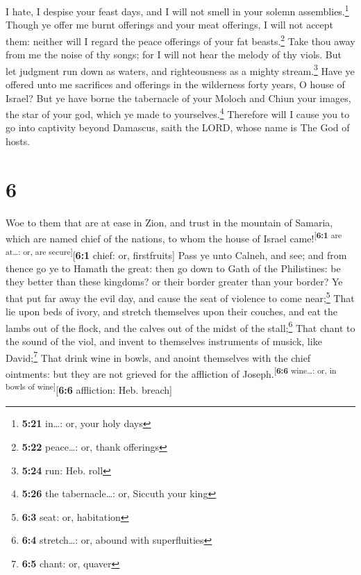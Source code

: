  I hate, I despise your feast days, and I will not smell
in your solemn assemblies.\footnote{\textbf{5:21} in\ldots: or, your
  holy days}  Though ye offer me burnt offerings and your
meat offerings, I will not accept them: neither will I regard the peace
offerings of your fat beasts.\footnote{\textbf{5:22} peace\ldots: or,
  thank offerings}  Take thou away from me the noise of
thy songs; for I will not hear the melody of thy viols. 
But let judgment run down as waters, and righteousness as a mighty
stream.\footnote{\textbf{5:24} run: Heb. roll}  Have ye
offered unto me sacrifices and offerings in the wilderness forty years,
O house of Israel?  But ye have borne the tabernacle of
your Moloch and Chiun your images, the star of your god, which ye made
to yourselves.\footnote{\textbf{5:26} the tabernacle\ldots: or, Siccuth
  your king}  Therefore will I cause you to go into
captivity beyond Damascus, saith the LORD, whose name is The God of
hosts.

\hypertarget{section-5}{%
\section{6}\label{section-5}}

 Woe to them that are at ease in Zion, and trust in the
mountain of Samaria, which are named chief of the nations, to whom the
house of Israel came!\textsuperscript{{[}\textbf{6:1} are at\ldots: or,
are secure{]}}{[}\textbf{6:1} chief: or, firstfruits{]} 
Pass ye unto Calneh, and see; and from thence go ye to Hamath the great:
then go down to Gath of the Philistines: be they better than these
kingdoms? or their border greater than your border?  Ye
that put far away the evil day, and cause the seat of violence to come
near;\footnote{\textbf{6:3} seat: or, habitation}  That
lie upon beds of ivory, and stretch themselves upon their couches, and
eat the lambs out of the flock, and the calves out of the midst of the
stall;\footnote{\textbf{6:4} stretch\ldots: or, abound with
  superfluities}  That chant to the sound of the viol, and
invent to themselves instruments of musick, like David;\footnote{\textbf{6:5}
  chant: or, quaver}  That drink wine in bowls, and anoint
themselves with the chief ointments: but they are not grieved for the
affliction of Joseph.\textsuperscript{{[}\textbf{6:6} wine\ldots: or, in
bowls of wine{]}}{[}\textbf{6:6} affliction: Heb. breach{]}

